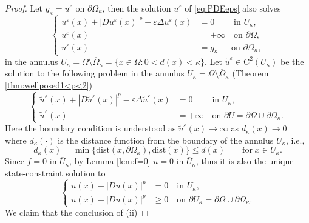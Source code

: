 \documentclass[11pt,reqno]{amsart}
\numberwithin{figure}{section}
\theoremstyle{plain}
\theoremstyle{remark}
\numberwithin{equation}{section}
\begin{document}
\begin{proof} Let $g_\kappa = u^\varepsilon$ on $\partial\Omega_{\kappa}$, then the solution $u^\varepsilon$ of \eqref{eq:PDEeps} also solves
\begin{equation*}
    \left\{
  \begin{aligned}
  u^\varepsilon(x) + |Du^\varepsilon(x)|^p-\varepsilon \Delta u^\varepsilon(x) &=0 \;\qquad \text{in } U_\kappa ,\\
  u^\varepsilon(x) &= +\infty \quad \text{on } \partial \Omega,\\
  u^\varepsilon(x) &= g_\kappa \;\;\quad \text{on } \partial \Omega_{\kappa},
    \end{aligned}
\right.
\end{equation*}
in the annulus $U_\kappa= \Omega \setminus \overline{\Omega}_{\kappa} = \{x\in \Omega: 0< d(x) < \kappa\}$. Let $\tilde{u}^\varepsilon\in \mathrm{C}^2(U_\kappa)$ be the solution to the following problem in the annulus $U_\kappa= \Omega \setminus \overline{\Omega}_{\kappa}$ (Theorem \ref{thm:wellposed1<p<2})
\begin{equation*}
    \left\{
        \begin{aligned}
            \tilde{u}^\varepsilon(x) + |D\tilde{u}^\varepsilon(x)|^p-\varepsilon \Delta \tilde{u}^\varepsilon(x) &=0 \;\qquad \text{in } U_\kappa ,\\
            \tilde{u}^\varepsilon(x) &= +\infty \quad \text{on } \partial U = \partial \Omega\cup \partial \Omega_{\kappa}.
        \end{aligned}
    \right.
\end{equation*}
Here the boundary condition is understood as $\tilde{u}^\varepsilon(x)\to \infty$ as $d_\kappa(x)\to 0$ where $d_\kappa(\cdot)$ is the distance function from the boundary of the annulus $U_\kappa$, i.e.,
\begin{equation*}
    d_\kappa(x) = \min \big\lbrace \mathrm{dist}(x,\partial \Omega_\kappa),\mathrm{dist}(x)  \big\rbrace \leq d(x) \qquad\text{for}\;x\in U_\kappa.
\end{equation*}
Since $f = 0$ in $\overline{U}_\kappa$, by Lemma \ref{lem:f=0} $u=0$ in $\overline{U}_\kappa$, thus it is also the unique state-constraint solution to
\begin{equation*}
    \left\{
        \begin{aligned}
            u(x)+ |Du(x)|^p &=0 \quad \text{in } U_\kappa ,\\
            u(x)+ |Du(x)|^p &\geq 0 \quad \text{on } \partial U_\kappa = \partial \Omega \cup\partial \Omega_{\kappa}.
        \end{aligned}
    \right.
\end{equation*}
We claim that the conclusion of (ii)


\end{proof}
\end{document}
